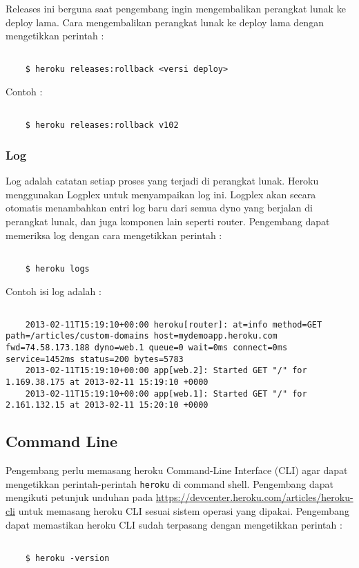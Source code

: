 Releases ini berguna saat pengembang ingin mengembalikan perangkat lunak ke deploy lama. Cara mengembalikan perangkat lunak ke deploy lama dengan mengetikkan perintah :
\begin{lstlisting}

	$ heroku releases:rollback <versi deploy>

\end{lstlisting}
Contoh :
\begin{lstlisting}

	$ heroku releases:rollback v102

\end{lstlisting}

\subsubsection{Log}
Log adalah catatan setiap proses yang terjadi di perangkat lunak. Heroku menggunakan Logplex untuk menyampaikan log ini. Logplex akan secara otomatis menambahkan entri log baru dari semua dyno yang berjalan di perangkat lunak, dan juga komponen lain seperti router. Pengembang dapat memeriksa log dengan cara mengetikkan perintah :
\begin{lstlisting}

	$ heroku logs

\end{lstlisting}
Contoh isi log adalah :
\begin{lstlisting}

	2013-02-11T15:19:10+00:00 heroku[router]: at=info method=GET path=/articles/custom-domains host=mydemoapp.heroku.com fwd=74.58.173.188 dyno=web.1 queue=0 wait=0ms connect=0ms service=1452ms status=200 bytes=5783
	2013-02-11T15:19:10+00:00 app[web.2]: Started GET "/" for 1.169.38.175 at 2013-02-11 15:19:10 +0000
	2013-02-11T15:19:10+00:00 app[web.1]: Started GET "/" for 2.161.132.15 at 2013-02-11 15:20:10 +0000

\end{lstlisting}

\subsection{Command Line}
Pengembang perlu memasang heroku Command-Line Interface (CLI) agar dapat mengetikkan perintah-perintah \texttt{heroku} di command shell. Pengembang dapat mengikuti petunjuk unduhan pada \url{https://devcenter.heroku.com/articles/heroku-cli} untuk memasang heroku CLI sesuai sistem operasi yang dipakai. Pengembang dapat memastikan heroku CLI sudah terpasang dengan mengetikkan perintah :
\begin{lstlisting}

	$ heroku -version

\end{lstlisting}

